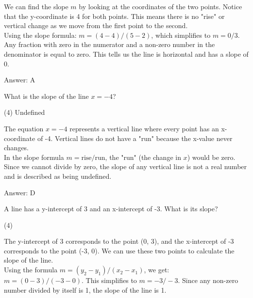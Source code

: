 \documentclass[11pt,paper=a4,answers]{exam}
\begin{document}
\begin{questions}
\begin{solution}
We can find the slope $m$ by looking at the coordinates of the two points. Notice that the y-coordinate is 4 for both points. This means there is no "rise" or vertical change as we move from the first point to the second.
\\[10pt]
Using the slope formula: $m = (4 - 4) / (5 - 2)$, which simplifies to $m = 0 / 3$. Any fraction with zero in the numerator and a non-zero number in the denominator is equal to zero. This tells us the line is horizontal and has a slope of 0.

\vspace{15pt}
Answer: \colorbox{yellow!100}{A}
\end{solution}

\question
What is the slope of the line $x = -4$?
\begin{tasks}(4)
    \task Undefined
\end{tasks}

\begin{solution}
The equation $x = -4$ represents a vertical line where every point has an x-coordinate of -4. Vertical lines do not have a "run" because the x-value never changes.
\\[10pt]
In the slope formula $m = \text{rise} / \text{run}$, the "run" (the change in $x$) would be zero. Since we cannot divide by zero, the slope of any vertical line is not a real number and is described as being undefined.

\vspace{15pt}
Answer: \colorbox{yellow!100}{D}
\end{solution}

\question
A line has a y-intercept of 3 and an x-intercept of -3. What is its slope?
\begin{tasks}(4)
\end{tasks}

\begin{solution}
The y-intercept of 3 corresponds to the point (0, 3), and the x-intercept of -3 corresponds to the point (-3, 0). We can use these two points to calculate the slope of the line.
\\[10pt]
Using the formula $m = (y_2 - y_1) / (x_2 - x_1)$, we get: $m = (0 - 3) / (-3 - 0)$. This simplifies to $m = -3 / -3$. Since any non-zero number divided by itself is 1, the slope of the line is 1.


\end{solution}
\end{questions}
\end{document}
